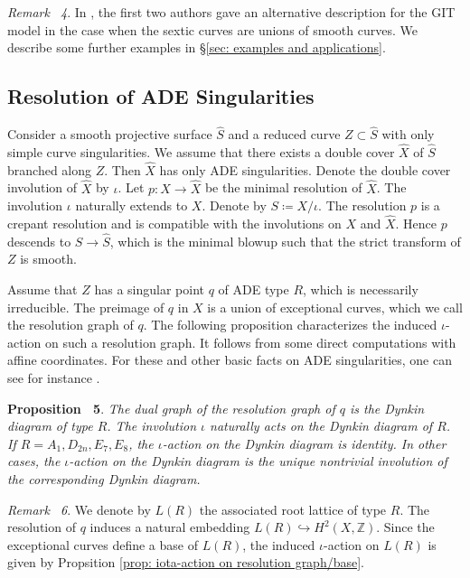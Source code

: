 \documentclass[
]{article}
\begin{document}
\emph{Remark~ 4}. In \cite[\S4.2]{yu2023moduli}, the first two authors
gave an alternative description for the GIT model in the case when the
sextic curves are unions of smooth curves. We describe some further
examples in §\ref{sec: examples and applications}.

\subsection{Resolution of ADE
Singularities}\label{subsection:ux20resolutionux20ofux20ADE}

Consider a smooth projective surface \(\widehat{S}\) and a reduced curve
\(Z\subset \widehat{S}\) with only simple curve singularities. We assume
that there exists a double cover \(\widehat{X}\) of \(\widehat{S}\)
branched along \(Z\). Then \(\widehat{X}\) has only ADE singularities.
Denote the double cover involution of \(\widehat{X}\) by \(\iota\). Let
\(p\colon X \to \widehat{X}\) be the minimal resolution of
\(\widehat{X}\). The involution \(\iota\) naturally extends to \(X\).
Denote by \(S\coloneqq X/\iota\). The resolution \(p\) is a crepant
resolution and is compatible with the involutions on \(X\) and
\(\widehat{X}\). Hence \(p\) descends to \(S\to \widehat{S}\), which is
the minimal blowup such that the strict transform of \(Z\) is smooth.

Assume that \(Z\) has a singular point \(q\) of ADE type \(R\), which is
necessarily irreducible. The preimage of \(q\) in \(X\) is a union of
exceptional curves, which we call the resolution graph of \(q\). The
following proposition characterizes the induced \(\iota\)-action on such
a resolution graph. It follows from some direct computations with affine
coordinates. For these and other basic facts on ADE singularities, one
can see for instance \cite[III, \S 7]{barth2004compact}.

\textbf{Proposition~ 5}.
\emph{\label{prop: iota-action on resolution graph/base} The dual graph
of the resolution graph of \(q\) is the Dynkin diagram of type \(R\).
The involution \(\iota\) naturally acts on the Dynkin diagram of \(R\).
If \(R=A_1, D_{2n}, E_7, E_8\), the \(\iota\)-action on the Dynkin
diagram is identity. In other cases, the \(\iota\)-action on the Dynkin
diagram is the unique nontrivial involution of the corresponding Dynkin
diagram.}

\emph{Remark~ 6}. \label{rmk: iota-action on L(R)} We denote by \(L(R)\)
the associated root lattice of type \(R\). The resolution of \(q\)
induces a natural embedding \(L(R)\hookrightarrow H^2(X,\mathbb{Z})\).
Since the exceptional curves define a base of \(L(R)\), the induced
\(\iota\)-action on \(L(R)\) is given by Propsition
\ref{prop: iota-action on resolution graph/base}.
\end{document}
